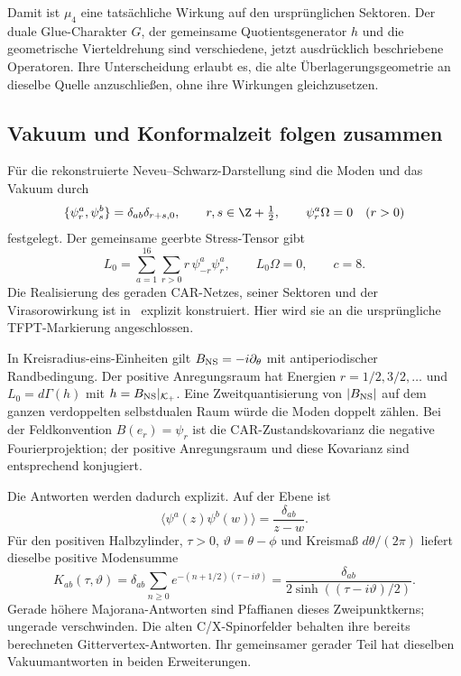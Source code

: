 Damit ist $\mu_4$ eine tatsächliche Wirkung auf den ursprünglichen Sektoren. Der duale Glue-Charakter $G$, der gemeinsame Quotientsgenerator $h$ und die geometrische Vierteldrehung sind verschiedene, jetzt ausdrücklich beschriebene Operatoren. Ihre Unterscheidung erlaubt es, die alte Überlagerungsgeometrie an dieselbe Quelle anzuschließen, ohne ihre Wirkungen gleichzusetzen.

\subsection{Vakuum und Konformalzeit folgen zusammen}
Für die rekonstruierte Neveu--Schwarz-Darstellung sind die Moden und das Vakuum durch
\begin{equation}
\{\psi_r^a,\psi_s^b\}=\delta_{ab}\delta_{r+s,0},\qquad
r,s\in\Z+\tfrac12,\qquad \psi_r^a\Omega=0\quad(r>0)
\end{equation}
festgelegt. Der gemeinsame geerbte Stress-Tensor gibt
\begin{equation}\label{eq:inverseL0}
\boxed{L_0=\sum_{a=1}^{16}\sum_{r>0}r\,\psi_{-r}^a\psi_r^a,
\qquad L_0\Omega=0,\qquad c=8.}
\end{equation}
Die Realisierung des geraden CAR-Netzes, seiner Sektoren und der Virasorowirkung ist in~\cite{bockenhauercar} explizit konstruiert. Hier wird sie an die ursprüngliche TFPT-Markierung angeschlossen.

In Kreisradius-eins-Einheiten gilt $B_{\rm NS}=-i\partial_\theta$ mit antiperiodischer Randbedingung. Der positive Anregungsraum hat Energien $r=1/2,3/2,\ldots$ und $L_0=d\Gamma(h)$ mit $h=B_{\rm NS}|_{\mathcal K_+}$. Eine Zweitquantisierung von $|B_{\rm NS}|$ auf dem ganzen verdoppelten selbstdualen Raum würde die Moden doppelt zählen. Bei der Feldkonvention $B(e_r)=\psi_r$ ist die CAR-Zustandskovarianz die negative Fourierprojektion; der positive Anregungsraum und diese Kovarianz sind entsprechend konjugiert.

Die Antworten werden dadurch explizit. Auf der Ebene ist
\begin{equation}
\langle\psi^a(z)\psi^b(w)\rangle=\frac{\delta_{ab}}{z-w}.
\end{equation}
Für den positiven Halbzylinder, $\tau>0$, $\vartheta=\theta-\phi$ und Kreismaß $d\theta/(2\pi)$ liefert dieselbe positive Modensumme
\begin{equation}\label{eq:inversekernel}
K_{ab}(\tau,\vartheta)
=\delta_{ab}\sum_{n\ge0}e^{-(n+1/2)(\tau-i\vartheta)}
=\frac{\delta_{ab}}{2\sinh((\tau-i\vartheta)/2)}.
\end{equation}
Gerade höhere Majorana-Antworten sind Pfaffianen dieses Zweipunktkerns; ungerade verschwinden. Die alten C/X-Spinorfelder behalten ihre bereits berechneten Gittervertex-Antworten. Ihr gemeinsamer gerader Teil hat dieselben Vakuumantworten in beiden Erweiterungen.

